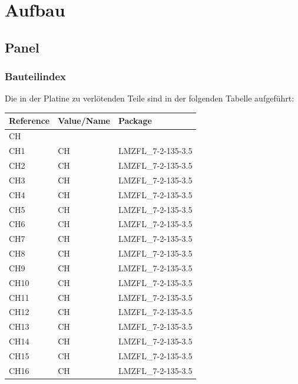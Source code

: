\documentclass[paper=a4, open=any]{scrbook}
\begin{document}
	\chapter{Aufbau}
		
		\section{Panel}

			\subsection*{Bauteilindex}

				Die in der Platine zu verlötenden Teile sind in der folgenden Tabelle aufgeführt:

				\begin{longtabu}
					to \textwidth[l]{lX[-1]X}
					Reference & Value/Name             & Package                            \\ \hline\hline
					\endhead
					CH        &                        &                                    \\*
					CH1       & CH                     & LMZFL\_7-2-135-3.5                 \\
					CH2       & CH                     & LMZFL\_7-2-135-3.5                 \\
					CH3       & CH                     & LMZFL\_7-2-135-3.5                 \\
					CH4       & CH                     & LMZFL\_7-2-135-3.5                 \\
					CH5       & CH                     & LMZFL\_7-2-135-3.5                 \\
					CH6       & CH                     & LMZFL\_7-2-135-3.5                 \\
					CH7       & CH                     & LMZFL\_7-2-135-3.5                 \\
					CH8       & CH                     & LMZFL\_7-2-135-3.5                 \\
					CH9       & CH                     & LMZFL\_7-2-135-3.5                 \\
					CH10      & CH                     & LMZFL\_7-2-135-3.5                 \\
					CH11      & CH                     & LMZFL\_7-2-135-3.5                 \\
					CH12      & CH                     & LMZFL\_7-2-135-3.5                 \\
					CH13      & CH                     & LMZFL\_7-2-135-3.5                 \\
					CH14      & CH                     & LMZFL\_7-2-135-3.5                 \\
					CH15      & CH                     & LMZFL\_7-2-135-3.5                 \\
					CH16      & CH                     & LMZFL\_7-2-135-3.5                 \\
					\hline


\end{longtabu}
\end{document}
